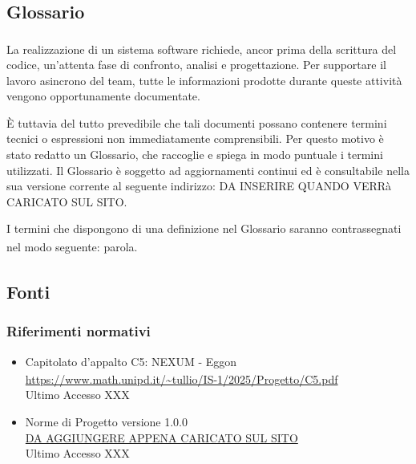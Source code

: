 \documentclass[a4paper,12pt]{article}
\begin{document}
\subsection{Glossario\textsubscript{}}
La realizzazione di un sistema software richiede, ancor prima della scrittura del codice, un'attenta fase di confronto, analisi e progettazione. Per supportare il lavoro asincrono del team, tutte le informazioni prodotte durante queste attività vengono opportunamente documentate.

È tuttavia del tutto prevedibile che tali documenti possano contenere termini tecnici o espressioni non immediatamente comprensibili. Per questo motivo è stato redatto un Glossario, che raccoglie e spiega in modo puntuale i termini utilizzati. Il Glossario è soggetto ad aggiornamenti continui ed è consultabile nella sua versione corrente al seguente indirizzo: DA INSERIRE QUANDO VERRà CARICATO SUL SITO.

I termini che dispongono di una definizione nel Glossario\textsubscript{} saranno contrassegnati nel modo seguente: parola\textsubscript{}.

\subsection{Fonti}

\subsubsection{Riferimenti normativi}
\begin{itemize}
    \item Capitolato\textsubscript{} d'appalto C5: NEXUM - Eggon \\
    \url{https://www.math.unipd.it/~tullio/IS-1/2025/Progetto/C5.pdf} \\
    Ultimo Accesso XXX
    \item Norme di Progetto versione 1.0.0 \\
    \url{DA AGGIUNGERE APPENA CARICATO SUL SITO} \\
    Ultimo Accesso XXX
\end{itemize}
\end{document}
